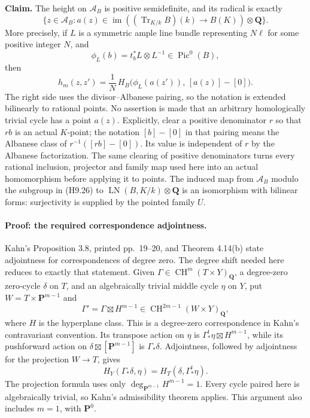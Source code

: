 \textbf{Claim.} The height on $\mathcal A_B$ is positive semidefinite,
and its radical is exactly
\[
 \{z\in\mathcal A_B:
      a(z)\in\operatorname{im}((\operatorname{Tr}_{K/k}B)(k)
                                  \longrightarrow B(K))
                                  \otimes\mathbf Q\}.       \tag{H9.26}
\]
More precisely, if $L$ is a symmetric ample line bundle representing
$N\ell$ for some positive integer $N$, and
\[
 \phi_L(b)=t_b^*L\otimes L^{-1}\in\operatorname{Pic}^0(B),
\]
then
\[
 h_m(z,z')=\frac1N\,
 H_B\bigl(\phi_L(a(z')),\,[a(z)]-[0]\bigr).                 \tag{H9.27}
\]
The right side uses the divisor--Albanese pairing, so the notation is
extended bilinearly to rational points. No assertion is made that an
arbitrary homologically trivial cycle has a point $a(z)$.
Explicitly, clear a positive denominator $r$ so that $rb$ is an actual
$K$-point; the notation $[b]-[0]$ in that pairing means the Albanese
class of $r^{-1}([rb]-[0])$. Its value is independent of $r$ by the
Albanese factorization. The same clearing of positive denominators
turns every rational inclusion, projector and family map used here
into an actual homomorphism before applying it to points.
The induced map from $\mathcal A_B$ modulo the subgroup in (H9.26) to
$\operatorname{LN}(B,K/k)\otimes\mathbf Q$ is an isomorphism with
bilinear forms: surjectivity is supplied by the pointed family $U$.

\paragraph{Proof: the required correspondence adjointness.}
Kahn's Proposition 3.8, printed pp.~19--20, and Theorem 4.14(b) state
adjointness for correspondences of degree zero. The degree shift needed
here reduces to exactly that statement. Given
$\Gamma\in\operatorname{CH}^{m}(T\times Y)_{\mathbf Q}$, a degree-zero
zero-cycle $\delta$ on $T$, and an algebraically trivial middle cycle
$\eta$ on $Y$, put $W=T\times\mathbf P^{m-1}$ and
\[
 \Gamma'=\Gamma\boxtimes H^{m-1}
   \in\operatorname{CH}^{2m-1}(W\times Y)_{\mathbf Q},
\]
where $H$ is the hyperplane class. This is a degree-zero
correspondence in Kahn's contravariant convention. Its transpose action
on $\eta$ is $\Gamma^t_*\eta\boxtimes H^{m-1}$, while its pushforward
action on $\delta\boxtimes[\mathbf P^{m-1}]$ is $\Gamma_*\delta$.
Adjointness, followed by adjointness for the projection $W\to T$, gives
\[
 H_Y(\Gamma_*\delta,\eta)
    =H_T(\delta,\Gamma^t_*\eta).                            \tag{H9.28}
\]
The projection formula uses only
$\deg_{\mathbf P^{m-1}}H^{m-1}=1$. Every cycle paired here is
algebraically trivial, so Kahn's admissibility theorem applies. This
argument also includes $m=1$, with $\mathbf P^0$.

